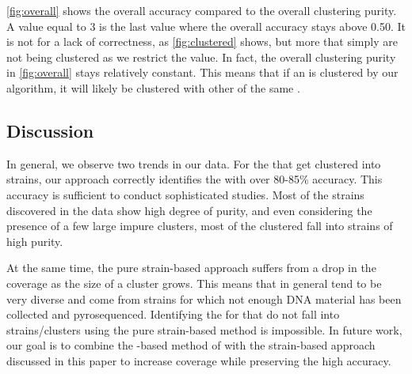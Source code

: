 \autoref{fig:overall} shows the overall accuracy compared to the overall clustering purity. 
A \minneigh{} value equal to 3 is the last \minneigh{} value where the overall accuracy stays above 0.50.
It is not for a lack of correctness, as \autoref{fig:clustered} shows, but more that \isols{} simply are not being clustered as we restrict the \minneigh{} value.
In fact, the overall clustering purity in \autoref{fig:overall} stays relatively constant.
This means that if an \isol{} is clustered by our algorithm, it will likely be clustered with other \isols{} of the same \spec{}.

\subsection{Discussion}\label{sec:results:discussion}

In general, we observe two trends in our data. For the \isols{} that get clustered into strains,
our approach correctly identifies the \spec{} with over 80-85\% accuracy. This accuracy
is sufficient to conduct sophisticated \mst{} studies. Most of the strains discovered 
in the \cplop{} data show high degree of purity, and even considering the presence of 
a few large impure clusters, most of the clustered \isols{} fall into strains of high purity.


At the same time, the pure strain-based approach suffers from a drop in the coverage as the size of a cluster grows. 
This means that in general \cplop{} \isols{} tend to be very diverse
and come from strains for which not enough DNA material has been collected and pyrosequenced.
Identifying the \spec{} for \isols{} that do not fall into strains/clusters using the pure strain-based
method is impossible. In future work, our goal is to combine the \kNN{}-based \mst{} method
of \cite{DBLP:conf/bibm/McGovernDKBVG15} with the strain-based approach discussed in this paper
to increase coverage while preserving the high \mst{} accuracy.







